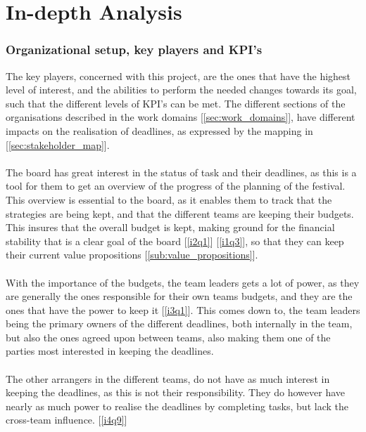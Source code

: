\part{In-depth Analysis}
\label{prt:in_depth_analysis}
\section{Organizational setup, key players and KPI's}
The key players, concerned with this project, are the ones that have the highest level of interest, and the abilities to perform the needed changes towards its goal, such that the different levels of KPI's can be met. The different sections of the organisations described in the work domains [\ref{sec:work_domains}], have different impacts on the realisation of deadlines, as expressed by the mapping in [\ref{sec:stakeholder_map}].
\\ \\
The board has great interest in the status of task and their deadlines, as this is a tool for them to get an overview of the progress of the planning of the festival. This overview is essential to the board, as it enables them to track that the strategies are being kept, and that the different teams are keeping their budgets. This insures that the overall budget is kept, making ground for the financial stability that is a clear goal of the board [\ref{i2q1}] [\ref{i1q3}], so that they can keep their current value propositions [\ref{sub:value_propositions}].
\\ \\
With the importance of the budgets, the team leaders gets a lot of power, as they are generally the ones responsible for their own teams budgets, and they are the ones that have the power to keep it [\ref{i3q1}]. This comes down to, the team leaders being the primary owners of the different deadlines, both internally in the team, but also the ones agreed upon between teams, also making them one of the parties most interested in keeping the deadlines.
\\ \\
The other arrangers in the different teams, do not have as much interest in keeping the deadlines, as this is not their responsibility. They do however have nearly as much power to realise the deadlines by completing tasks, but lack the cross-team influence. [\ref{i4q9}]


